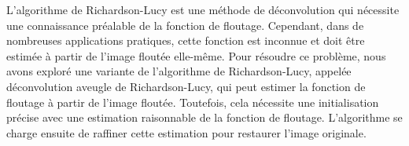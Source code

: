 L'algorithme de Richardson-Lucy est une méthode de déconvolution qui nécessite une connaissance préalable de la fonction de floutage.
Cependant, dans de nombreuses applications pratiques, cette fonction est inconnue et doit être estimée à partir de l'image floutée elle-même.
Pour résoudre ce problème, nous avons exploré une variante de l'algorithme de Richardson-Lucy, appelée déconvolution aveugle de Richardson-Lucy, qui peut estimer la fonction de floutage à partir de l'image floutée.
Toutefois, cela nécessite une initialisation précise avec une estimation raisonnable de la fonction de floutage. L'algorithme se charge ensuite de raffiner cette estimation pour restaurer l'image originale.